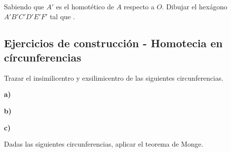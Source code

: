 \newpage
\begin{section-exercise}
    Sabiendo que $A'$ es el homotético de $A$ respecto a $O$.
    Dibujar el hexágono $A' B' C' D' E' F'$ tal que .
    \vspace*{\fill}
    \begin{figure}[H]
        \centering
        
    \end{figure}
    \vspace*{\fill}
\end{section-exercise}






\newpage
\subsection{Ejercicios de construcción - Homotecia en círcunferencias}

\begin{section-exercise}
    Trazar el insimilicentro y exsilimicentro de las siguientes circunferencias.

    \textbf{a)}
    \vspace*{\fill}
    \begin{figure}[H]
        \centering
        
    \end{figure}
    \vspace*{\fill}
    \newpage
    \textbf{b)}
    \vspace*{\fill}
    \begin{figure}[H]
        \centering
        
    \end{figure}
    \vspace*{\fill}
    \newpage
    \textbf{c)}
    \vspace*{\fill}
    \begin{figure}[H]
        \centering
        
    \end{figure}
    \vspace*{\fill}
\end{section-exercise}

\newpage
\begin{section-exercise}
    Dadas las siguientes circunferencias, aplicar el teorema de Monge.
    \vspace*{\fill}
    \begin{figure}[H]
        \centering
        
    \end{figure}
    \vspace*{\fill}
\end{section-exercise}

